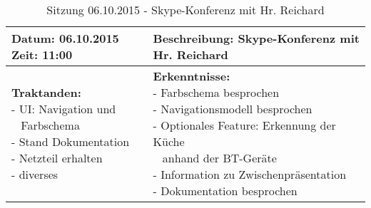 \begin{table}[H]
\begin{tabularx}{\textwidth}{| l | X |}
\hline
\textbf{Datum:} 06.10.2015
\textbf{Zeit:} 11:00
&
\textbf{Beschreibung:} Skype-Konferenz mit Hr. Reichard \\ \hline
\specialcell[t]{
\textbf{Traktanden:}\\
- UI: Navigation und\\~ Farbschema\\
- Stand Dokumentation\\
- Netzteil erhalten\\
- diverses\\
}
& 
\specialcell[t]{
\textbf{Erkenntnisse:}\\
- Farbschema besprochen\\
- Navigationsmodell besprochen\\
- Optionales Feature: Erkennung der Küche\\~ anhand der BT-Geräte\\
- Information zu Zwischenpräsentation\\
- Dokumentation besprochen\\
}
\\ \hline
\end{tabularx}
\caption{Sitzung 06.10.2015 - Skype-Konferenz mit Hr. Reichard}
\end{table}



